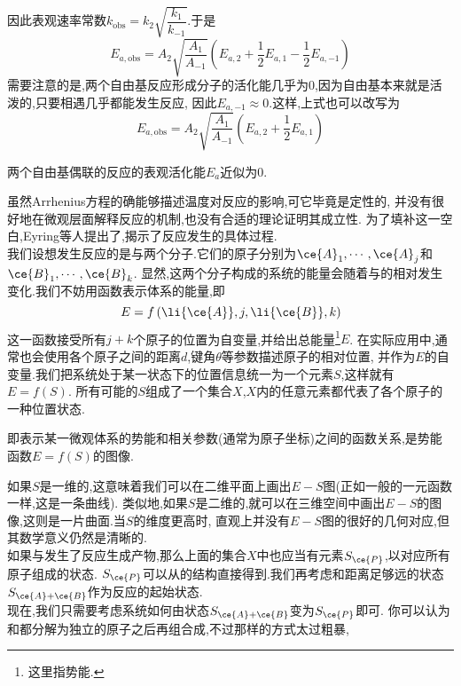 \documentclass{ctexart}
\begin{document}
因此表观速率常数$k_{\text{obs}}=k_2\sqrt{\dfrac{k_1}{k_{-1}}}$.于是
\[E_{a,\text{obs}}=A_2\sqrt{\dfrac{A_1}{A_{-1}}}\left(E_{a,2}+\dfrac12E_{a,1}-\dfrac12E_{a,-1}\right)\]
需要注意的是,两个自由基反应形成分子的活化能几乎为$0$,因为自由基本来就是活泼的,只要相遇几乎都能发生反应,%
因此$E_{a,-1}\approx0$.这样,上式也可以改写为
\[E_{a,\text{obs}}=A_2\sqrt{\dfrac{A_1}{A_{-1}}}\left(E_{a,2}+\dfrac12E_{a,1}\right)\]
\begin{theorem}[7E.1.3 自由基偶联反应的表观活化能]
    两个自由基偶联的反应的表观活化能$E_a$近似为$0$.
\end{theorem}
\vspace{8pt}
\indent 虽然Arrhenius方程的确能够描述温度对反应的影响,可它毕竟是定性的,%
并没有很好地在微观层面解释反应的机制,也没有合适的理论证明其成立性.%
为了填补这一空白,Eyring等人提出了,揭示了反应发生的具体过程.\vspace{4pt}\\
\indent 我们设想发生反应的是与两个分子.它们的原子分别为$\ce{A}_1,\cdots,\ce{A}_j$和$\ce{B}_1,\cdots,\ce{B}_k$.%
显然,这两个分子构成的系统的能量会随着与的相对发生变化.我们不妨用函数表示体系的能量,即
\[E=f\left(\li{\ce{A}},j,\li{\ce{B}},k\right)\]
这一函数接受所有$j+k$个原子的位置为自变量,并给出总能量\footnote{这里指势能.}$E$.%
在实际应用中,通常也会使用各个原子之间的距离$d$,键角$\theta$等参数描述原子的相对位置,%
并作为$E$的自变量.我们把系统处于某一状态下的位置信息统一为一个元素$S$,这样就有$E=f(S)$.%
所有可能的$S$组成了一个集合$X$,$X$内的任意元素都代表了各个原子的一种位置状态.
\begin{definition}[7E.2.1 势能面]
    即表示某一微观体系的势能和相关参数(通常为原子坐标)之间的函数关系,是势能函数$E=f(S)$的图像.
\end{definition}
\indent 如果$S$是一维的,这意味着我们可以在二维平面上画出$E-S$图(正如一般的一元函数一样,这是一条曲线).%
类似地,如果$S$是二维的,就可以在三维空间中画出$E-S$的图像,这则是一片曲面.当$S$的维度更高时,%
直观上并没有$E-S$图的很好的几何对应,但其数学意义仍然是清晰的.\\
\indent 如果与发生了反应生成产物,那么上面的集合$X$中也应当有元素$S_{\ce{P}}$,以对应所有原子组成的状态.%
$S_{\ce{P}}$可以从的结构直接得到.我们再考虑和距离足够远的状态$S_{\ce{A}+\ce{B}}$作为反应的起始状态.\\
\indent 现在,我们只需要考虑系统如何由状态$S_{\ce{A}+\ce{B}}$变为$S_{\ce{P}}$即可.%
你可以认为和都分解为独立的原子之后再组合成,不过那样的方式太过粗暴,%
\end{document}
